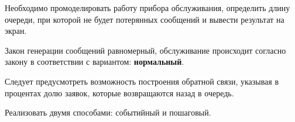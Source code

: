 Необходимо промоделировать работу прибора обслуживания, определить длину очереди, при которой не будет потерянных сообщений и вывести результат на экран. 

Закон генерации сообщений равномерный, обслуживание происходит согласно закону в соответствии с вариантом: \textbf{нормальный}.

Следует предусмотреть возможность построения обратной связи, указывая в процентах долю заявок, которые возвращаются назад в очередь. 

Реализовать двумя способами: событийный и пошаговый.
